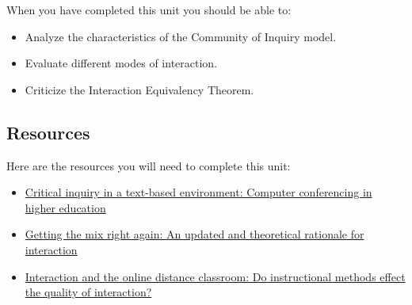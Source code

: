 \documentclass[
]{book}
\providecommand{\tightlist}{%
  \setlength{\itemsep}{0pt}\setlength{\parskip}{0pt}}
\begin{document}
When you have completed this unit you should be able to:

\begin{itemize}
\tightlist
\item
  Analyze the characteristics of the Community of Inquiry model.
\item
  Evaluate different modes of interaction.
\item
  Criticize the Interaction Equivalency Theorem.
\end{itemize}

\hypertarget{resources-1}{%
\subsection*{Resources}\label{resources-1}}

Here are the resources you will need to complete this unit:

\begin{itemize}
\tightlist
\item
  \href{https://www-sciencedirect-com.twu.idm.oclc.org/science/article/pii/S1096751600000166}{Critical inquiry in a text-based environment: Computer conferencing in higher education}\\
\item
  \href{http://www.irrodl.org/index.php/irrodl/article/view/149/230}{Getting the mix right again: An updated and theoretical rationale for interaction}\\
\item
  \href{https://rdcu.be/cKSGf}{Interaction and the online distance classroom: Do instructional methods effect the quality of interaction?}
\end{itemize}
\end{document}
